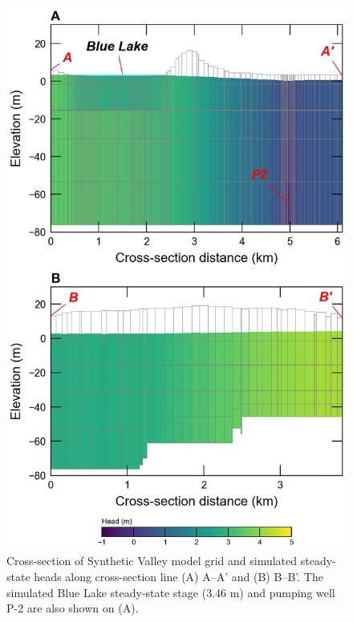 \documentclass[12pt, oneside]{article}  	%
\begin{document}
\begin{figure}[ht!]
	\begin{center}
		\includegraphics{figures/mv_voronoi_xsection.png}
	\end{center}
	\caption{Cross-section of Synthetic Valley model grid and simulated steady-state heads along cross-section line (A) A--A' and (B) B--B'. The simulated Blue Lake steady-state stage (3.46 m) and pumping well P-2 are also shown on (A).}
	\label{fig:mvxsection}
\end{figure}
\end{document}

